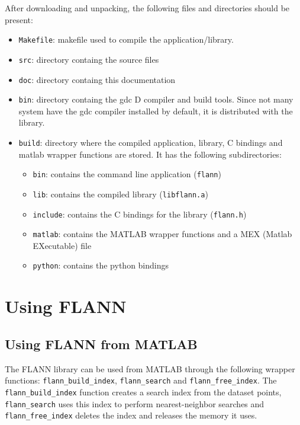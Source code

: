 \documentclass[letter,10pt]{article}
\begin{document}
After downloading and unpacking, the following files and directories should
be present:
\begin{itemize}
\item \texttt{Makefile}: makefile used to compile the application/library.
\item \texttt{src}: directory containg the source files
\item \texttt{doc}: directory containg this documentation
\item \texttt{bin}: directory containg the gdc D compiler and build tools.
Since not many system have the gdc compiler installed by default, it is
distributed with the library.
\item \texttt{build}: directory where the compiled application, library, C
bindings and matlab wrapper functions are stored. It has the following
subdirectories:
\begin{itemize}
\item \texttt{bin}: contains the command line application (\texttt{flann})
\item \texttt{lib}: contains the compiled library (\texttt{libflann.a})
\item \texttt{include}: contains the C bindings for the library (\texttt{flann.h})
\item \texttt{matlab}: contains the MATLAB wrapper functions and a MEX (Matlab EXecutable) file
\item \texttt{python}: contains the python bindings
\end{itemize}

\end{itemize}

\section{Using FLANN}

\subsection{Using FLANN from MATLAB}


The FLANN library can be used from MATLAB through the following wrapper
functions: \texttt{flann\_build\_index}, \texttt{flann\_search} and
\texttt{flann\_free\_index}. The \texttt{flann\_build\_index} function
creates a search index from the dataset points, \texttt{flann\_search} uses
this index to perform nearest-neighbor searches and
\texttt{flann\_free\_index} deletes the index and releases the memory it
uses.
\end{document}
